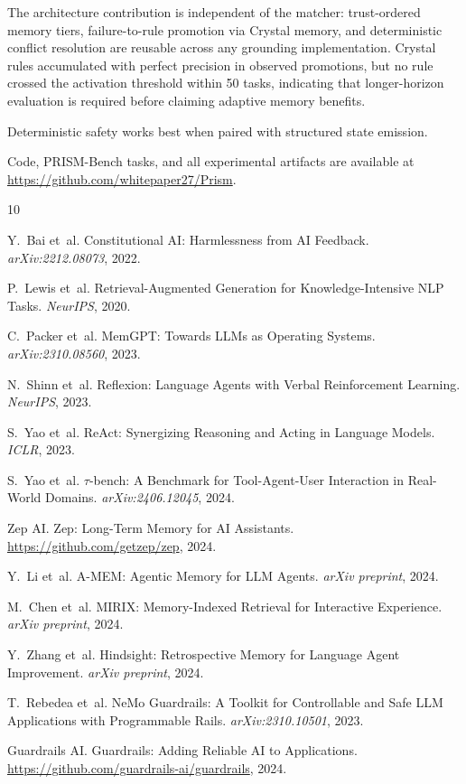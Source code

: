 \documentclass[11pt]{article}
\begin{document}
The architecture contribution is independent of the matcher:
trust-ordered memory tiers, failure-to-rule promotion via Crystal memory,
and deterministic conflict resolution are reusable across any
grounding implementation. Crystal rules accumulated with perfect
precision in observed promotions, but no rule crossed the activation
threshold within 50 tasks, indicating that longer-horizon evaluation
is required before claiming adaptive memory benefits.

Deterministic safety works best when paired with structured state emission.

Code, PRISM-Bench tasks, and all experimental artifacts are available at
\url{https://github.com/whitepaper27/Prism}.


\begin{thebibliography}{10}

Y.~Bai et~al.
\newblock Constitutional AI: Harmlessness from AI Feedback.
\newblock \emph{arXiv:2212.08073}, 2022.

P.~Lewis et~al.
\newblock Retrieval-Augmented Generation for Knowledge-Intensive NLP Tasks.
\newblock \emph{NeurIPS}, 2020.

C.~Packer et~al.
\newblock MemGPT: Towards LLMs as Operating Systems.
\newblock \emph{arXiv:2310.08560}, 2023.

N.~Shinn et~al.
\newblock Reflexion: Language Agents with Verbal Reinforcement Learning.
\newblock \emph{NeurIPS}, 2023.

S.~Yao et~al.
\newblock ReAct: Synergizing Reasoning and Acting in Language Models.
\newblock \emph{ICLR}, 2023.

S.~Yao et~al.
\newblock $\tau$-bench: A Benchmark for Tool-Agent-User Interaction in Real-World Domains.
\newblock \emph{arXiv:2406.12045}, 2024.

Zep AI.
\newblock Zep: Long-Term Memory for AI Assistants.
\newblock \url{https://github.com/getzep/zep}, 2024.

Y.~Li et~al.
\newblock A-MEM: Agentic Memory for LLM Agents.
\newblock \emph{arXiv preprint}, 2024.

M.~Chen et~al.
\newblock MIRIX: Memory-Indexed Retrieval for Interactive Experience.
\newblock \emph{arXiv preprint}, 2024.

Y.~Zhang et~al.
\newblock Hindsight: Retrospective Memory for Language Agent Improvement.
\newblock \emph{arXiv preprint}, 2024.

T.~Rebedea et~al.
\newblock NeMo Guardrails: A Toolkit for Controllable and Safe LLM Applications with Programmable Rails.
\newblock \emph{arXiv:2310.10501}, 2023.

Guardrails AI.
\newblock Guardrails: Adding Reliable AI to Applications.
\newblock \url{https://github.com/guardrails-ai/guardrails}, 2024.

\end{thebibliography}
\end{document}
